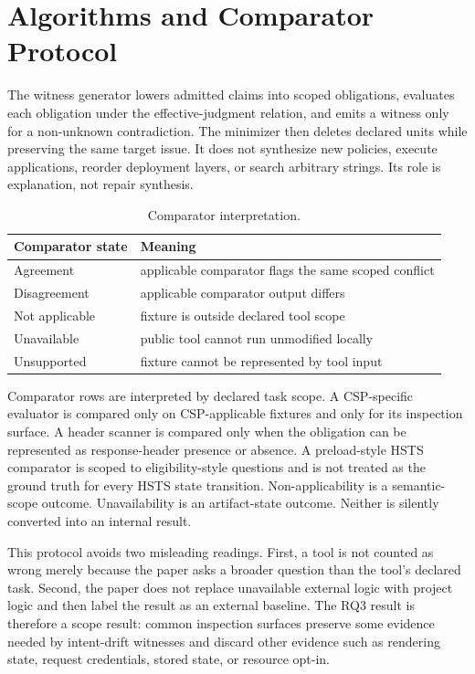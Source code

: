 \documentclass[10pt,conference]{IEEEtran}
\begin{document}
\section{Algorithms and Comparator Protocol}

The witness generator lowers admitted claims into scoped obligations, evaluates each obligation under the effective-judgment relation, and emits a witness only for a non-unknown contradiction. The minimizer then deletes declared units while preserving the same target issue. It does not synthesize new policies, execute applications, reorder deployment layers, or search arbitrary strings. Its role is explanation, not repair synthesis.

\begin{table}[t]
\centering
\caption{Comparator interpretation.}
\label{tab:supp-comparator}
\begin{tabular}{p{}p{}}
\toprule
Comparator state & Meaning \\
\midrule
Agreement & applicable comparator flags the same scoped conflict \\
Disagreement & applicable comparator output differs \\
Not applicable & fixture is outside declared tool scope \\
Unavailable & public tool cannot run unmodified locally \\
Unsupported & fixture cannot be represented by tool input \\
\bottomrule
\end{tabular}
\end{table}

Comparator rows are interpreted by declared task scope. A CSP-specific evaluator is compared only on CSP-applicable fixtures and only for its inspection surface. A header scanner is compared only when the obligation can be represented as response-header presence or absence. A preload-style HSTS comparator is scoped to eligibility-style questions and is not treated as the ground truth for every HSTS state transition. Non-applicability is a semantic-scope outcome. Unavailability is an artifact-state outcome. Neither is silently converted into an internal result.

This protocol avoids two misleading readings. First, a tool is not counted as wrong merely because the paper asks a broader question than the tool's declared task. Second, the paper does not replace unavailable external logic with project logic and then label the result as an external baseline. The RQ3 result is therefore a scope result: common inspection surfaces preserve some evidence needed by intent-drift witnesses and discard other evidence such as rendering state, request credentials, stored state, or resource opt-in.
\end{document}
